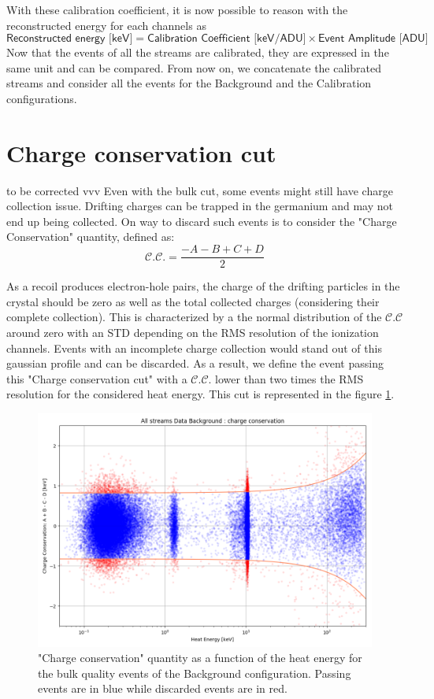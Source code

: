 With these calibration coefficient, it is now possible to reason with the reconstructed energy for each channels as
$$
\textsf{Reconstructed energy [keV]}
=
\textsf{Calibration Coefficient [keV/ADU]}
\times
\textsf{Event Amplitude [ADU]}
$$
Now that the events of all the streams are calibrated, they are expressed in the same unit and can be compared. From now on, we concatenate the calibrated streams and consider all the events for the Background and the Calibration configurations.

\section{Charge conservation cut}
\label{par:charge-conservation-cut}

to be corrected vvv
Even with the bulk cut, some events might still have charge collection issue. Drifting charges can be trapped in the germanium and may not end up being collected. On way to discard such events is to consider the "Charge Conservation" quantity, defined as:
\begin{equation}
\mathcal{C.C.} = \frac{-A-B+C+D}{2}
\end{equation}

As a recoil produces electron-hole pairs, the charge of the drifting particles in the crystal should be zero as well as the total collected charges (considering their complete collection). This is characterized by a the normal distribution of the $\mathcal{C.C}$ around zero with an STD depending on the RMS resolution of the ionization channels. Events with an incomplete charge collection would stand out of this gaussian profile and can be discarded. As a result, we define the event passing this "Charge conservation cut" with a $\mathcal{C.C.}$ lower than two times the RMS resolution for the considered heat energy. This cut is represented in the figure \ref{fig:charge-conservation}.

\begin{figure}
\centering
\includegraphics[width=\linewidth,]{Figures/Neutron/charge_conservation.png}
\caption{"Charge conservation" quantity as a function of the heat energy for the bulk quality events of the Background configuration. Passing events are in blue while discarded events are in red.}
\label{fig:charge-conservation}
\end{figure}

